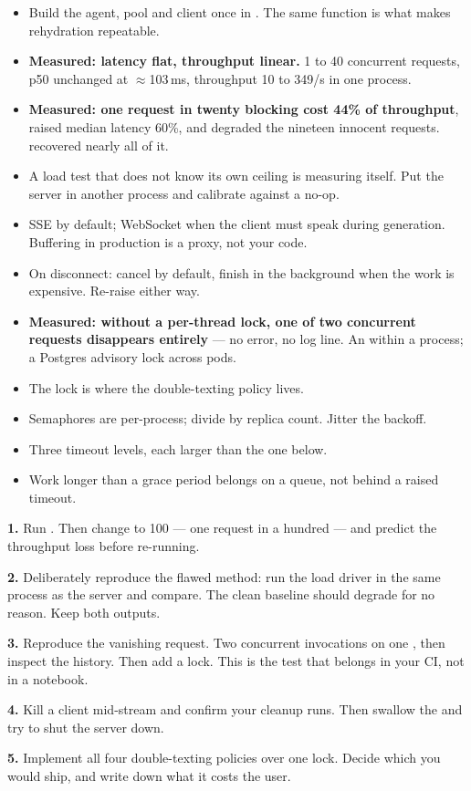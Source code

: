 \begin{itemize}[leftmargin=1.4em]
\item Build the agent, pool and client once in . The same
       function is what makes rehydration repeatable.
\item \textbf{Measured: latency flat, throughput linear.} 1 to 40 concurrent
      requests, p50 unchanged at $\approx$103\,ms, throughput 10 to 349/s in one
      process.
\item \textbf{Measured: one request in twenty blocking cost 44\% of
      throughput}, raised median latency 60\%, and degraded the nineteen
      innocent requests.  recovered nearly all of it.
\item A load test that does not know its own ceiling is measuring itself. Put
      the server in another process and calibrate against a no-op.
\item SSE by default; WebSocket when the client must speak during generation.
      Buffering in production is a proxy, not your code.
\item On disconnect: cancel by default, finish in the background when the work is
      expensive. Re-raise  either way.
\item \textbf{Measured: without a per-thread lock, one of two concurrent requests
      disappears entirely} --- no error, no log line. An 
      within a process; a Postgres advisory lock across pods.
\item The lock is where the double-texting policy lives.
\item Semaphores are per-process; divide by replica count. Jitter the backoff.
\item Three timeout levels, each larger than the one below.
\item Work longer than a grace period belongs on a queue, not behind a raised
      timeout.
\end{itemize}

\begin{exercisebox}
\textbf{1.} Run . Then change
 to 100 --- one request in a hundred --- and predict the
throughput loss before re-running.

\textbf{2.} Deliberately reproduce the flawed method: run the load driver in the
same process as the server and compare. The clean baseline should degrade for no
reason. Keep both outputs.

\textbf{3.} Reproduce the vanishing request. Two concurrent invocations on one
, then inspect the history. Then add a lock. This is the test
that belongs in your CI, not in a notebook.

\textbf{4.} Kill a client mid-stream and confirm your cleanup runs. Then swallow
the  and try to shut the server down.

\textbf{5.} Implement all four double-texting policies over one lock. Decide
which you would ship, and write down what it costs the user.
\end{exercisebox}

